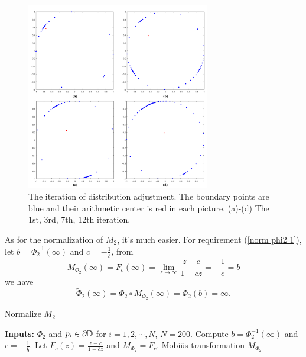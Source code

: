 \documentclass[review,onefignum,onetabnum]{siamonline190516}
\begin{document}
    \begin{figure}
        \begin{center}
            \includegraphics[width=8cm]{fig9.png}
        \end{center}
        \caption{The iteration of distribution adjustment. The boundary points are blue and their arithmetic center is red in each picture. (a)-(d) The 1st, 3rd, 7th, 12th iteration.}
    \end{figure}
    
    As for the normalization of $M_2$, it's much easier. For requirement (\ref{norm phi2 1}), let $b = \Phi_2^{-1}(\infty)$ and $c = -\frac{1}{\bar{b}}$, from
    \begin{equation*}
        M_{\Phi_2}(\infty) = F_{c}(\infty) = \lim_{z \rightarrow \infty} \frac{z -c}{1 - \bar{c}z} = -\frac{1}{\overline{c}} = b
    \end{equation*}
    we have 
    \begin{equation*}
        \tilde{\Phi}_2(\infty) = \Phi_2 \circ M_{\Phi_2}(\infty) = \Phi_2(b) = \infty.
    \end{equation*}

    \begin{algorithm}[H]
    \caption{Normalize $M_2$}
    \label{alg norm phi2}
    \begin{algorithmic}
        \STATE \textbf{Inputs:} $\Phi_2$ and $p_i \in \partial \mathbb{D}$ for $i=1, 2, \cdots, N$, $N=200$.
        \STATE Compute $b = \Phi_2^{-1}(\infty)$ and $c = -\frac{1}{\overline{b}}$.
        \STATE Let $F_c(z) = \frac{z-c}{1-\overline{c}z}$ and $M_{\Phi_2} = F_{c}$.
        \RETURN Mobi\"us transformation $M_{\Phi_2}$
    \end{algorithmic}
    \end{algorithm}
\end{document}
